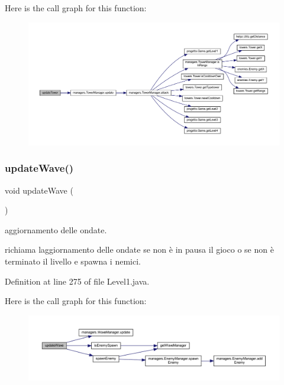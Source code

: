 Here is the call graph for this function\+:\nopagebreak
\begin{figure}[H]
\begin{center}
\leavevmode
\includegraphics[width=350pt]{classscenes_1_1_level1_ae4fd4a959e4d782a5e7ac0eff77ba27f_cgraph}
\end{center}
\end{figure}
\mbox{\label{classscenes_1_1_level1_ab424ab29e7ab4733f2efd1e6ef3f13b1}} 
\subsubsection{\texorpdfstring{update\+Wave()}{updateWave()}}
{\footnotesize\ttfamily void update\+Wave (\begin{DoxyParamCaption}{ }\end{DoxyParamCaption})}



aggiornamento delle ondate. 

richiama l\textquotesingle{}aggiornamento delle ondate se non è in pausa il gioco o se non è terminato il livello e spawna i nemici. 

Definition at line 275 of file Level1.\+java.

Here is the call graph for this function\+:\nopagebreak
\begin{figure}[H]
\begin{center}
\leavevmode
\includegraphics[width=350pt]{classscenes_1_1_level1_ab424ab29e7ab4733f2efd1e6ef3f13b1_cgraph}
\end{center}
\end{figure}


